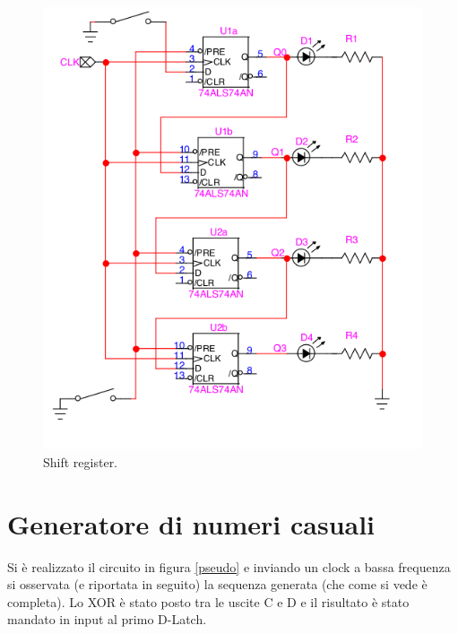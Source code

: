 \documentclass[10pt,a4paper]{article}
\begin{document}
\begin{figure}
\centering
\includegraphics[scale=0.5]{shift.png}
\caption{Shift register.\label{shift}}
\end{figure}

\section{Generatore di numeri casuali}
Si è realizzato il circuito in figura \ref{pseudo} e inviando un clock a bassa frequenza si osservata (e riportata in seguito) la sequenza generata (che come si vede è completa). 
Lo XOR è stato posto tra le uscite C e D e il risultato è stato mandato in input al primo  D-Latch.\\
\end{document}
